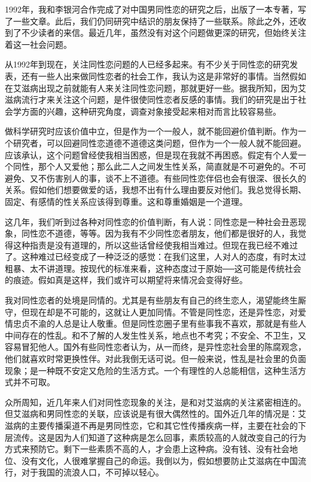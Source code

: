 1992年，我和李银河合作完成了对中国男同性恋的研究之后，出版了一本专著，写了一些文章。此后，我们仍同研究中结识的朋友保持了一些联系。除此之外，还收到了不少读者的来信。最近几年，虽然没有对这个问题做更深的研究，但始终关注着这一社会问题。 

从1992年到现在，关注同性恋问题的人已经多起来。有不少关于同性恋的研究发表，还有一些人出来做同性恋者的社会工作，我认为这是非常好的事情。当然假如在艾滋病出现之前就能有人来关注同性恋问题，那就更好一些。据我所知，因为艾滋病流行才来关注这个问题，是件很使同性恋者反感的事情。我们的研究是出于社会学方面的兴趣，这种研究角度，调查对象接受起来相对而言比较容易些。 

做科学研究时应该价值中立，但是作为一个一般人，就不能回避价值判断。作为一个研究者，可以回避同性恋道德不道德这类问题，但作为一个一般人就不能回避。应该承认，这个问题曾经使我相当困惑，但是现在我就不再困惑。假定有个人爱一个同性，那个人又爱他；那么此二人之间发生性关系，简直就是不可避免的。不可避免、又不伤害别人的事，谈不上不道德。有些同性恋伴侣也会有很深、很长久的关系。假如他们想要做爱的话，我想不出有什么理由要反对他们。我总觉得长期、固定、有感情的性关系应该得到尊重。这和尊重婚姻是一个道理。 

这几年，我们听到过各种对同性恋的价值判断，有人说：同性恋是一种社会丑恶现象，同性恋不道德，等等。因为我有不少同性恋者朋友，他们都是很好的人，我觉得这种指责是没有道理的，所以这些话曾经使我相当难过。但现在我已经不难过了。这种难过已经变成了一种泛泛的感觉：在我们这里，人对人的态度，有时太过粗暴、太不讲道理。按现代的标准来看，这种态度过于原始──这可能是传统社会的痕迹。假如真是这样，我们或许可以期望将来情况会变得好些。 

我对同性恋者的处境是同情的。尤其是有些朋友有自己的终生恋人，渴望能终生厮守，但现在却是不可能的，这就让人更加同情。不管是同性恋，还是异性恋，对爱情忠贞不渝的人总是让人敬重。但是同性恋圈子里有些事我不喜欢，那就是有些人中间存在的性乱。和不了解的人发生性关系，地点也不考究；不安全、不卫生，又容易冒犯他人。国外有些同性恋者认为，从一而终，是异性恋社会里的陈腐观念，他们就喜欢时常更换性伴。对此我倒无话可说。但一般来说，性乱是社会里的负面现象；是一种既不安定又危险的生活方式。一个有理性的人总能相信，这种生活方式并不可取。 

众所周知，近几年来人们对同性恋现象的关注，是和对艾滋病的关注紧密相连的。但艾滋病和男同性恋的关联，应该说是有很大偶然性的。国外近几年的情况是：艾滋病的主要传播渠道不再是男同性恋，它和其它性传播疾病一样，主要在社会的下层流传。这是因为人们知道了这种病是怎么回事，素质较高的人就改变自己的行为方式来预防它。剩下一些素质不高的人，才会患上这种病。没有钱、没有社会地位、没有文化，人很难掌握自己的命运。我倒以为，假如想要防止艾滋病在中国流行，对于我国的流浪人口，不可掉以轻心。 

